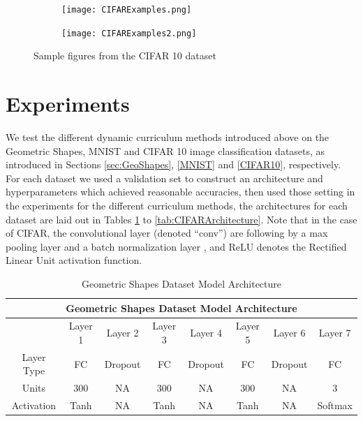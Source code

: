 \begin{figure}[h!]
\hspace*{-2cm}    
\centering
\begin{subfigure}{.6\textwidth}
  \centering
  \texttt{[image: CIFARExamples.png]}
\end{subfigure}%
\begin{subfigure}{.6\textwidth}
  \centering
  \texttt{[image: CIFARExamples2.png]}
\end{subfigure}
\caption{Sample figures from the CIFAR 10 dataset}
\label{fig:CIFARSamples}
\end{figure}



\section{Experiments}
We test the different dynamic curriculum methods introduced above on the Geometric Shapes, MNIST and CIFAR 10 image classification datasets, as introduced in Sections \ref{sec:GeoShapes}, \ref{MNIST} and \ref{CIFAR10}, respectively. For each dataset we used a validation set to construct an architecture and hyperparameters which achieved reasonable accuracies, then used those setting in the experiments for the different curriculum methods, the architectures for each dataset are laid out in Tables \ref{tab:GeoArchitecture2} to \ref{tab:CIFARArchitecture}. Note that in the case of CIFAR, the convolutional layer (denoted ``conv'') are following by a max pooling layer \cite{nagi2011max} and a batch normalization layer \cite{ioffe2015batch}, and ReLU denotes the Rectified Linear Unit activation function\cite{nair2010rectified}. 

\begin{table}[h!]
\caption{Geometric Shapes Dataset Model Architecture} \label{tab:GeoArchitecture2}
\begin{tabular}{|c||c|c|c|c|c|c|c|}
\hline
\multicolumn{8}{|c|}{Geometric Shapes Dataset Model Architecture} \\
\hline
 & Layer 1 & Layer 2 & Layer 3& Layer 4 &Layer 5 & Layer 6 & Layer 7 \\
\hline
\hline
Layer Type & FC & Dropout & FC & Dropout & FC & Dropout  & FC \\
\hline
Units & 300 & NA & 300 & NA & 300 & NA & 3 \\
\hline
Activation & Tanh & NA & Tanh & NA & Tanh & NA & Softmax \\
\hline
\end{tabular}
\end{table}


